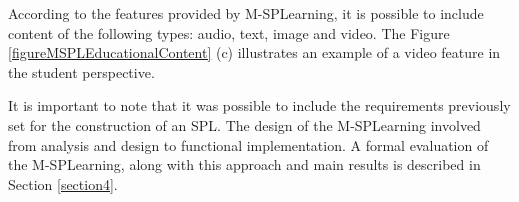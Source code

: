 According to the features provided by M-SPLearning, it is possible to include content of the following types: audio, text, image and video. %
The Figure \ref{figureMSPLEducationalContent} (c) illustrates an example of a video feature in the student perspective.

It is important to note that it was possible to include the requirements previously set for the construction of an SPL. The design of the M-SPLearning involved from analysis and design to functional implementation. A formal evaluation of the M-SPLearning, along with this approach and main results is described in Section \ref{section4}.